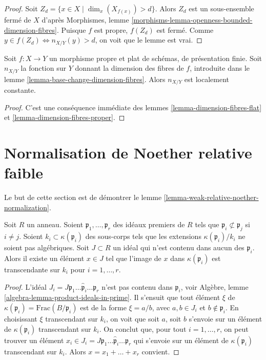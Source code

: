 \begin{proof}
Soit $Z_d = \{x \in X \mid \dim_x(X_{f(x)}) > d\}$.
Alors $Z_d$ est un sous-ensemble fermé de $X$ d'après
Morphismes, lemme \ref{morphisms-lemma-openness-bounded-dimension-fibres}.
Puisque $f$ est propre, $f(Z_d)$ est fermé.
Comme $y \in f(Z_d) \Leftrightarrow n_{X/Y}(y) > d$,
on voit que le lemme est vrai.
\end{proof}

\begin{lemma}
\label{lemma-dimension-fibres-proper-flat}
Soit $f : X \to Y$ un morphisme propre et plat de schémas, de présentation finie.
Soit $n_{X/Y}$ la fonction sur $Y$ donnant la dimension des fibres de $f$,
introduite dans le lemme \ref{lemma-base-change-dimension-fibres}.
Alors $n_{X/Y}$ est localement constante.
\end{lemma}

\begin{proof}
C'est une conséquence immédiate des
lemmes \ref{lemma-dimension-fibres-flat} et
\ref{lemma-dimension-fibres-proper}.
\end{proof}

\section{Normalisation de Noether relative faible}
\label{section-relative-noether-normalization}

\noindent
Le but de cette section est de démontrer le
lemme \ref{lemma-weak-relative-noether-normalization}.

\begin{lemma}
\label{lemma-silly}
Soit $R$ un anneau. Soient $\mathfrak p_1, \ldots, \mathfrak p_r$
des idéaux premiers de $R$ tels que $\mathfrak p_i \not \subset \mathfrak p_j$
si $i \not = j$. Soient $k_i \subset \kappa(\mathfrak p_i)$ des
sous-corps tels que les extensions $\kappa(\mathfrak p_i)/k_i$
ne soient pas algébriques. Soit $J \subset R$ un idéal qui n'est contenu
dans aucun des $\mathfrak p_i$. Alors il existe un élément $x \in J$
tel que l'image de $x$ dans $\kappa(\mathfrak p_i)$
est transcendante sur $k_i$ pour $i = 1, \ldots, r$.
\end{lemma}

\begin{proof}
L'idéal
$J_i = J \mathfrak p_1 \ldots \hat{\mathfrak p}_i \ldots \mathfrak p_r$ n'est pas
contenu dans $\mathfrak p_i$, voir
Algèbre, lemme \ref{algebra-lemma-product-ideals-in-prime}.
Il s'ensuit que tout élément $\xi$ de
$\kappa(\mathfrak p_i) = \text{Frac}(B/\mathfrak p_i)$
est de la forme $\xi = a/b$, avec $a, b \in J_i$
et $b \not \in \mathfrak p_i$. En choisissant $\xi$ transcendant
sur $k_i$, on voit que soit $a$, soit $b$ s'envoie sur un élément
de $\kappa(\mathfrak p_i)$ transcendant sur $k_i$.
On conclut que, pour tout $i = 1, \ldots, r$,
on peut trouver un élément
$x_i \in J_i = J \mathfrak p_1 \ldots \hat{\mathfrak p}_i \ldots \mathfrak p_r$
qui s'envoie sur un élément de $\kappa(\mathfrak p_i)$
transcendant sur $k_i$. Alors $x = x_1 + \ldots + x_r$ convient.
\end{proof}

